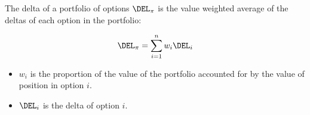The delta of a portfolio of options $\DEL_{\pi}$ is the value weighted average of the deltas of each option in the portfolio:

\[ \DEL_{\pi} = \sum^{n}_{i=1}w_i \DEL_i\]


\begin{itemize}
\item $w_i$ is the proportion of the value of the portfolio accounted for by the value of position in option $i$.
\item $ \DEL_i$ is the delta of option $i$.
\end{itemize}




